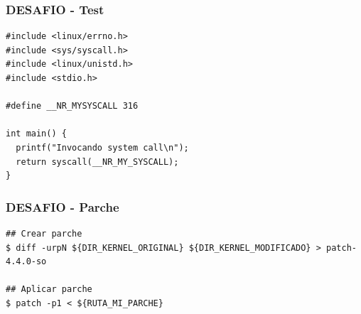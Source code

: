 \begin{frame}[fragile]
\frametitle{DESAFIO - Test}
  \begin{lstlisting}
#include <linux/errno.h>
#include <sys/syscall.h>
#include <linux/unistd.h>
#include <stdio.h>

#define __NR_MYSYSCALL 316

int main() {
  printf("Invocando system call\n");
  return syscall(__NR_MY_SYSCALL);
}
  \end{lstlisting}  
\end{frame}


\begin{frame}[fragile]
\frametitle{DESAFIO - Parche}
  \begin{lstlisting}
## Crear parche
$ diff -urpN ${DIR_KERNEL_ORIGINAL} ${DIR_KERNEL_MODIFICADO} > patch-4.4.0-so

## Aplicar parche
$ patch -p1 < ${RUTA_MI_PARCHE}
  \end{lstlisting}  
\end{frame}

